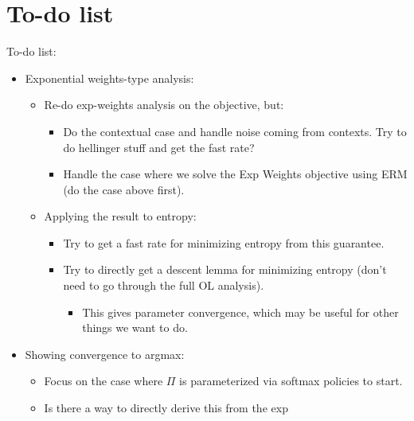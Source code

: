 \documentclass{article}
\begin{document}
\section{To-do list}
To-do list:
\begin{itemize}
\item Exponential weights-type analysis:
  \begin{itemize}
  \item Re-do exp-weights analysis on the objective, but:
    \begin{itemize}
    \item Do the contextual case and handle noise coming from
      contexts. Try to do hellinger stuff and get the fast rate? 
    \item Handle the case where we solve the Exp Weights objective
      using ERM (do the case above first).
    \end{itemize}
    \item Applying the result to entropy:
      \begin{itemize}
      \item Try to get a fast rate for minimizing entropy from
        this guarantee.
      \item Try to directly get a descent lemma for minimizing entropy
        (don't need to go through the full OL analysis).
        \begin{itemize}
        \item This gives parameter convergence, which may be useful
          for other things we want to do.
        \end{itemize}
    \end{itemize}
  \end{itemize}
\item Showing convergence to argmax:
  \begin{itemize}
  \item Focus on the case where $\Pi$ is parameterized via softmax
    policies to start.
  \item Is there a way to directly derive this from the exp
    

\end{itemize}
\end{itemize}
\end{document}

